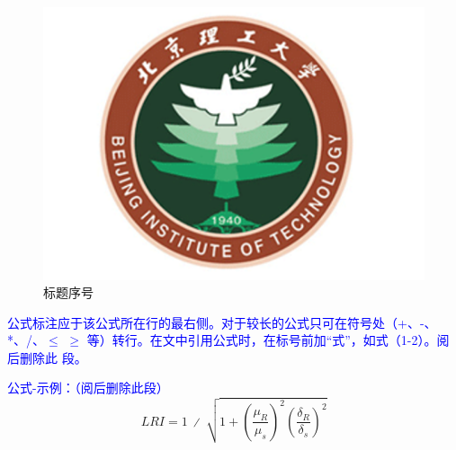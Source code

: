 \begin{figure}[htbp]
  \vspace{13pt} %
  \centering
  \includegraphics[]{images/bit_logo.png}
  \caption{标题序号}\label{标题序号} %
\end{figure}

\textcolor{blue}{公式标注应于该公式所在行的最右侧。对于较长的公式只可在符号处（+、-、*、/、$\leqslant$ $\geqslant$ 等）转行。在文中引用公式时，在标号前加“式”，如式（1-2）。阅后删除此
段。}

\textcolor{blue}{公式-示例：（阅后删除此段）}
\begin{equation}
    LRI=1\ ∕\ \sqrt{1+{\left(\frac{{\mu }_{R}}{{\mu }_{s}}\right)}^{2}{\left(\frac{{\delta }_{R}}{{\delta }_{s}}\right)}^{2}}
\end{equation}
